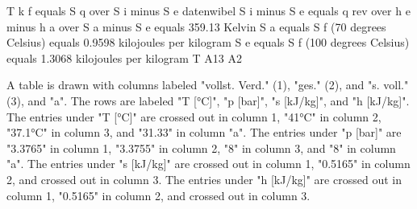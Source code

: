 T k f equals S q over S i minus S e
datenwibel
S i minus S e equals q rev over h e minus h a over S a minus S e equals 359.13 Kelvin
S a equals S f (70 degrees Celsius) equals 0.9598 kilojoules per kilogram
S e equals S f (100 degrees Celsius) equals 1.3068 kilojoules per kilogram T A13 A2

A table is drawn with columns labeled "vollst. Verd." (1), "ges." (2), and "s. voll." (3), and "a". The rows are labeled "T [°C]", "p [bar]", "s [kJ/kg]", and "h [kJ/kg]". The entries under "T [°C]" are crossed out in column 1, "41°C" in column 2, "37.1°C" in column 3, and "31.33" in column "a". The entries under "p [bar]" are "3.3765" in column 1, "3.3755" in column 2, "8" in column 3, and "8" in column "a". The entries under "s [kJ/kg]" are crossed out in column 1, "0.5165" in column 2, and crossed out in column 3. The entries under "h [kJ/kg]" are crossed out in column 1, "0.5165" in column 2, and crossed out in column 3.